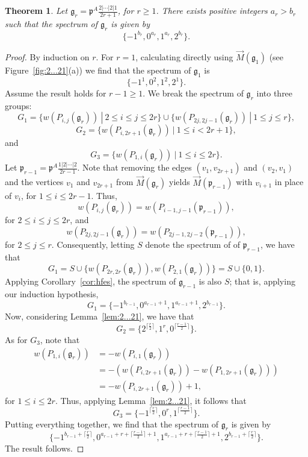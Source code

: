 \documentclass[letterpaper,10pt]{article}
\newtheorem{theorem}{Theorem}
\begin{document}
\begin{theorem}\label{thm:221}
Let $\mathfrak{g}_r=\mathfrak{p}^A\frac{2|\cdots|2|1}{2r+1}$, for $r\ge 1$. There exists positive integers $a_r>b_r$ such that the spectrum of $\mathfrak{g}_r$ is given by $$\{-1^{b_r},0^{a_r},1^{a_r},2^{b_r}\}.$$
\end{theorem}
\begin{proof}
By induction on $r$. For $r=1$, calculating directly using $\overrightarrow{M}(\mathfrak{g}_1)$ (see Figure~\ref{fig:2...21}(a)) we find that the spectrum of $\mathfrak{g}_1$ is $$\{-1^1,0^2,1^2,2^1\}.$$ Assume the result holds for $r-1\ge 1$. We break the spectrum of $\mathfrak{g}_r$ into three groups: $$G_1=\{w(P_{i,j}(\mathfrak{g}_r))~|~2\le i\le j\le 2r\}\cup\{w(P_{2j,2j-1}(\mathfrak{g}_r))~|~1\le j\le r\},$$ $$G_2=\{w(P_{i,2r+1}(\mathfrak{g}_r))~|~1\le i< 2r+1\},$$ and $$G_3=\{w(P_{1,i}(\mathfrak{g}_r))~|~1\le i\le 2r\}.$$  Let $\mathfrak{p}_{r-1}=\mathfrak{p}^A\frac{1|2|\cdots|2}{2r-1}$. Note that removing the edges $(v_1,v_{2r+1})$ and $(v_2,v_1)$ and the vertices $v_1$ and $v_{2r+1}$ from $\overrightarrow{M}(\mathfrak{g}_r)$ yields $\overrightarrow{M}(\mathfrak{p}_{r-1})$ with $v_{i+1}$ in place of $v_i$, for $1\le i\le 2r-1$. Thus, $$w(P_{i,j}(\mathfrak{g}_r))=w(P_{i-1,j-1}(\mathfrak{p}_{r-1})),$$ for $2\le i\le j\le 2r$, and $$w(P_{2j,2j-1}(\mathfrak{g}_r))=w(P_{2j-1,2j-2}(\mathfrak{p}_{r-1})),$$ for $2\le j\le r$. Consequently, letting $S$ denote the spectrum of of $\mathfrak{p}_{r-1}$, we have that
$$G_1=S\cup \{w(P_{2r,2r}(\mathfrak{g}_r)),w(P_{2,1}(\mathfrak{g}_r))\}=S\cup \{0,1\}.$$ Applying Corollary~\ref{cor:hfes}, the spectrum of $\mathfrak{g}_{r-1}$ is also $S$; that is, applying our induction hypothesis, $$G_1=\{-1^{b_{r-1}},0^{a_{r-1}+1},1^{a_{r-1}+1},2^{b_{r-1}}\}.$$ Now, considering Lemma~\ref{lem:2...21}, we have that $$G_2=\{2^{\lceil\frac{r}{2}\rceil},1^r,0^{\lceil\frac{r-1}{2}\rceil}\}.$$ As for $G_3$, note that
\begin{align*}
    w(P_{1,i}(\mathfrak{g}_r))&=-w(P_{i,1}(\mathfrak{g}_r)) \\
    &=-(w(P_{i,2r+1}(\mathfrak{g}_r))-w(P_{1,2r+1}(\mathfrak{g}_r))) \\
    &=-w(P_{i,2r+1}(\mathfrak{g}_r))+1,
\end{align*}
for $1\le i\le 2r$. Thus, applying Lemma~\ref{lem:2...21}, it follows that $$G_3=\{-1^{\lceil\frac{r}{2}\rceil},0^r,1^{\lceil\frac{r-1}{2}\rceil}\}.$$ Putting everything together, we find that the spectrum of $\mathfrak{g}_r$ is given by $$\{-1^{b_{r-1}+\lceil\frac{r}{2}\rceil},0^{a_{r-1}+r+\lceil\frac{r-1}{2}\rceil+1},1^{a_{r-1}+r+\lceil\frac{r-1}{2}\rceil+1},2^{b_{r-1}+\lceil\frac{r}{2}\rceil}\}.$$ The result follows.
\end{proof}
\end{document}
